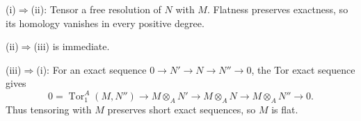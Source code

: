 (i)$\Rightarrow$(ii): Tensor a free resolution of $N$ with $M$. Flatness preserves exactness, so its homology vanishes in every positive degree.

(ii)$\Rightarrow$(iii) is immediate.

(iii)$\Rightarrow$(i): For an exact sequence $0\to N'\to N\to N''\to0$, the Tor exact sequence gives
\[0=\operatorname{Tor}_1^A(M,N'')\to M\otimes_A N'\to M\otimes_A N\to M\otimes_A N''\to0.\]
Thus tensoring with $M$ preserves short exact sequences, so $M$ is flat.
